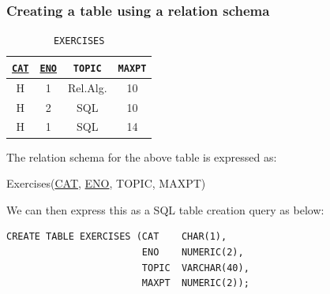 \documentclass{article}
\begin{document}
\subsubsection*{Creating a table using a relation schema}
\begin{table}[H]
\begin{center}
 \begin{tabular}{| c | c | c | c |} 
 \hline
 \underline{\texttt{CAT}} & \underline{\texttt{ENO}} & \texttt{TOPIC} & \texttt{MAXPT} \\ [0.5ex] 
 \hline
 H & 1 & Rel.Alg. & 10 \\
 H & 2 & SQL & 10 \\
 H & 1 & SQL & 14 \\
 \hline
\end{tabular}
\end{center}
\caption{\texttt{EXERCISES}}
\end{table}
The relation schema for the above table is expressed as:
\begin{center}
    Exercises(\underline{CAT}, \underline{ENO}, TOPIC, MAXPT)
\end{center}
We can then express this as a SQL table creation query as below:
\begin{lstlisting}
CREATE TABLE EXERCISES (CAT    CHAR(1),
                        ENO    NUMERIC(2),
                        TOPIC  VARCHAR(40),
                        MAXPT  NUMERIC(2));
\end{lstlisting}
\end{document}

